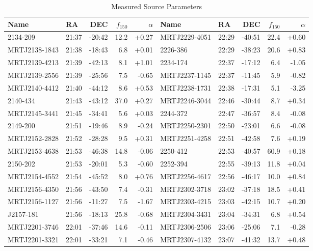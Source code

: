 \documentclass[preprint]{aastex}
\begin{document}
\begin{table}[ht]
\caption{Measured Source Parameters}
\begin{tabular}{l|lrrr||l|lrrr}
\hline
Name & RA & DEC & $f_{150}$ & $\alpha$ & Name & RA & DEC & $f_{150}$ & $\alpha$
\\
\hline
  2134-209 & 21:37 & -20:42 &   12.2 & +0.27 & MRTJ2229-4051 & 22:29 & -40:51 &   22.4 & +0.60 \\
MRTJ2138-1843 & 21:38 & -18:43 &    6.8 & +0.01 &   2226-386 & 22:29 & -38:23 &   20.6 & +0.83 \\
MRTJ2139-4213 & 21:39 & -42:13 &    8.1 & +1.01 &   2234-174 & 22:37 & -17:12 &    6.4 & -1.05 \\
MRTJ2139-2556 & 21:39 & -25:56 &    7.5 & -0.65 & MRTJ2237-1145 & 22:37 & -11:45 &    5.9 & -0.82 \\
MRTJ2140-4412 & 21:40 & -44:12 &    8.6 & +0.53 & MRTJ2238-1731 & 22:38 & -17:31 &    5.1 & -3.25 \\
  2140-434 & 21:43 & -43:12 &   37.0 & +0.27 & MRTJ2246-3044 & 22:46 & -30:44 &    8.7 & +0.34 \\
MRTJ2145-3441 & 21:45 & -34:41 &    5.6 & +0.03 &   2244-372 & 22:47 & -36:57 &    8.4 & -0.08 \\
  2149-200 & 21:51 & -19:46 &    8.9 & -0.24 & MRTJ2250-2301 & 22:50 & -23:01 &    6.6 & -0.08 \\
MRTJ2152-2828 & 21:52 & -28:28 &    9.5 & +0.31 & MRTJ2251-4258 & 22:51 & -42:58 &    7.6 & +0.19 \\
MRTJ2153-4638 & 21:53 & -46:38 &   14.8 & -0.06 &   2250-412 & 22:53 & -40:57 &   60.9 & +0.18 \\
  2150-202 & 21:53 & -20:01 &    5.3 & -0.60 &   2252-394 & 22:55 & -39:13 &   11.8 & +0.04 \\
MRTJ2154-4552 & 21:54 & -45:52 &    8.0 & +0.76 & MRTJ2256-4617 & 22:56 & -46:17 &   10.0 & +0.84 \\
MRTJ2156-4350 & 21:56 & -43:50 &    7.4 & -0.31 & MRTJ2302-3718 & 23:02 & -37:18 &   18.5 & +0.41 \\
MRTJ2156-1127 & 21:56 & -11:27 &    7.5 & -1.67 & MRTJ2303-4215 & 23:03 & -42:15 &   10.7 & +0.20 \\
 J2157-181 & 21:56 & -18:13 &   25.8 & -0.68 & MRTJ2304-3431 & 23:04 & -34:31 &    6.8 & +0.54 \\
MRTJ2201-3746 & 22:01 & -37:46 &   14.6 & -0.11 & MRTJ2306-2506 & 23:06 & -25:06 &    7.1 & -0.28 \\
MRTJ2201-3321 & 22:01 & -33:21 &    7.1 & -0.46 & MRTJ2307-4132 & 23:07 & -41:32 &   13.7 & +0.48 \\

\end{tabular}
\end{table}
\end{document}
